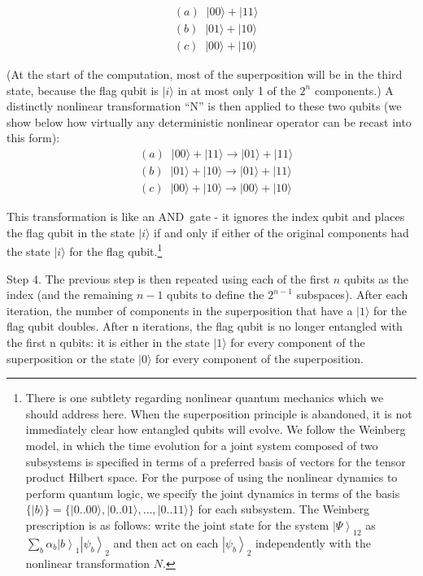 \documentclass[12pt]{article}
\begin{document}
\begin{align}
&  (a)\;\;|00\rangle+|11\rangle\nonumber\\
&  (b)\;\;|01\rangle+|10\rangle\\
&  (c)\;\;|00\rangle+|10\rangle\nonumber
\end{align}

(At the start of the computation, most of the superposition will be in the
third state, because the flag qubit is
$\vert i \rangle$
in at most only 1 of the $2^{n}$ components.) A distinctly nonlinear
transformation ``N'' is then applied to these two qubits (we show below how
virtually any deterministic nonlinear operator can be recast into this form):
\begin{align}
&  (a)\;\;|00\rangle+|11\rangle\longrightarrow|01\rangle+|11\rangle\nonumber\\
&  (b)\;\;|01\rangle+|10\rangle\longrightarrow|01\rangle+|11\rangle\\
&  (c)\;\;|00\rangle+|10\rangle\longrightarrow|00\rangle+|10\rangle\nonumber
\end{align}

This transformation is like an AND\ gate - it ignores the index qubit and
places the flag qubit in the state
$\vert i \rangle$
if and only if either of the original components had the state
$\vert i \rangle$ for the flag qubit.\footnote{There is one subtlety regarding nonlinear quantum
mechanics which we should address here. When the superposition principle is
abandoned, it is not immediately clear how entangled qubits will evolve. We
follow the Weinberg model, in which the time evolution for a joint system
composed of two subsystems is specified in terms of a preferred basis of
vectors for the tensor product Hilbert space. For the purpose of using the
nonlinear dynamics to perform quantum logic, we specify the joint dynamics in
terms of the basis $\{\vert b \rangle\} = \{ \vert 0..00\rangle, \vert 0..01\rangle, \dots ,\vert 0..11\rangle\}$
for each subsystem. The Weinberg prescription is as follows: write the
joint state for the system $\left|  \Psi\right\rangle _{12}$ as $\sum
\limits_{b}\alpha_{b}\left|  b\right\rangle _{1}\left|  \psi_{b}\right\rangle
_{2}$ and then act on each $\left|  \psi_{b}\right\rangle _{2}$ independently
with the nonlinear transformation $N$.}

Step 4. The previous step is then repeated using each of the first $n$ qubits as
the index (and the remaining $n-1$ qubits to define the $2^{n-1}$ subspaces).
After each iteration, the number of components in the superposition that have
a
$\vert 1 \rangle$
for the flag qubit doubles. After n iterations, the flag qubit is no longer
entangled with the first n qubits: it is either in the state
$\vert 1 \rangle$ for every component of the superposition or the state
$\vert 0 \rangle$ for every component of the superposition.
\end{document}
